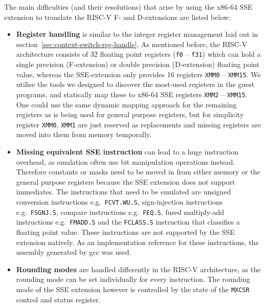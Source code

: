 The main difficulties (and their resolutions) that arise by using the x86-64 SSE extension to translate the RISC-V F- and D-extensions are listed below:
\begin{itemize}
    \item \textbf{Register handling} is similar to the integer register management laid out in section~\ref{sec:context-switch-reg-handle}.
            As mentioned before, the RISC-V architecture consists of 32 floating point registers (\texttt{f0} -- \texttt{f31}) which can hold a single precision (F-extension) or double precision (D-extension) floating point value, whereas the SSE-extension only provides 16 registers \texttt{XMM0} -- \texttt{XMM15}.
            We utilise the tools we designed to discover the most-used registers in the guest programs, and statically map these to x86-64 SSE registers \texttt{XMM2} -- \texttt{XMM15}.
            One could use the same dynamic mapping approach for the remaining registers as is being used for general purpose registers, but for simplicity register \texttt{XMM0}, \texttt{XMM1} are just reserved as replacements and missing registers are moved into them from memory temporally.
    \item \textbf{Missing equivalent SSE instruction} can lead to a huge instruction overhead, as emulation often use bit manipulation operations instead.
            Therefore constants or masks need to be moved in from either memory or the general purpose registers because the SSE extension does not support immediates.
            The instructions that need to be emulated are unsigned conversion instructions e.g.~\texttt{FCVT.WU.S}, sign-injection instructions e.g.~\texttt{FSGNJ.S}, compare instructions e.g.~\texttt{FEQ.S}, fused multiply-add instructions e.g.~\texttt{FMADD.S} and the \texttt{FCLASS.S} instruction that classifies a floating point value.
            These instructions are not supported by the SSE extension natively.
            As an implementation reference for these instructions, the assembly generated by gcc was used.
    \item \textbf{Rounding modes} are handled differently in the RISC-V architecture, as the rounding mode can be set individually for every instruction.
            The rounding mode of the SSE extension however is controlled by the state of the \texttt{MXCSR} control and status register.

\end{itemize}
